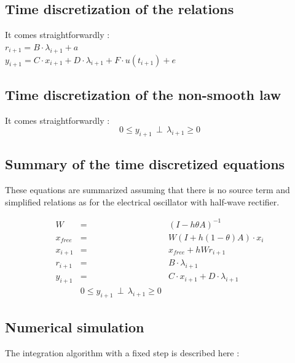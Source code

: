 \documentclass[10pt]{article}
\begin{document}
\subsection{Time discretization of the relations}
It comes straightforwardly :\\

$r_{i+1} = B \cdot \lambda_{i+1} + a$\\

$y_{i+1} = C \cdot x_{i+1} + D \cdot \lambda_{i+1} + F \cdot u(t_{i+1}) + e$\\


\subsection{Time discretization of the non-smooth law}
It comes straightforwardly :
\[
0 \leq y_{i+1} \, \perp \, \lambda_{i+1} \geq 0
\]

\subsection{Summary of the time discretized equations}
These equations are summarized assuming that there is no source term and simplified relations as for the 
electrical oscillator with half-wave rectifier.

\begin{eqnarray*}
W & = & (I - h \theta A)^{-1} \\
x_{free} & = & W(I + h (1-\theta) A) \cdot x_{i} \\
x_{i+1} & = & x_{free} + h W r_{i+1} \\
r_{i+1} & = & B \cdot \lambda_{i+1}  \\
y_{i+1} & = & C \cdot x_{i+1} + D \cdot \lambda_{i+1}  \\
 & 0 \leq y_{i+1} \, \perp \, \lambda_{i+1} \geq 0 & 
\end{eqnarray*}

\subsection{Numerical simulation}
The integration algorithm with a fixed step is described here :
\end{document}

